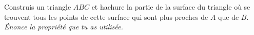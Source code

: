 Construis un triangle $ABC$ et hachure la partie de la surface du triangle où se trouvent tous les points de cette surface qui sont plus proches de $A$ que de $B$. {\em \'Enonce la propriété que tu as utilisée.}

